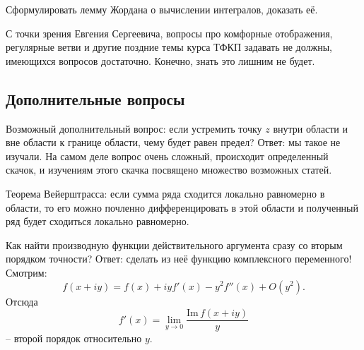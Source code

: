 Сформулировать лемму Жордана о вычислении интегралов, доказать её.

С точки зрения Евгения Сергеевича, вопросы про комфорные отображения, регулярные ветви и другие поздние темы курса ТФКП задавать не должны, имеющихся вопросов достаточно. Конечно, знать это лишним не будет.

\subsection{Дополнительные вопросы}

Возможный дополнительный вопрос: если устремить точку $z$ внутри области и вне области к границе области, чему будет равен предел? Ответ: мы такое не изучали. На самом деле вопрос очень сложный, происходит определенный скачок, и изучениям этого скачка посвящено множество возможных статей.

Теорема Вейерштрасса: если сумма ряда сходится локально равномерно в области, то его можно почленно дифференцировать в этой области и полученный ряд будет сходиться локально равномерно.

Как найти производную функции действительного аргумента сразу со вторым порядком точности? Ответ: сделать из неё функцию комплексного переменного! Смотрим:
\begin{equation*}
    f(x + iy) = f(x) + iyf'(x) - y^2f''(x) + O(y^2).
\end{equation*}
Отсюда
\begin{equation*}
    f'(x) = \lim_{y \to 0} \frac{\mathrm{Im}\, f(x + iy)}{y}
\end{equation*}
-- второй порядок относительно $y$.




